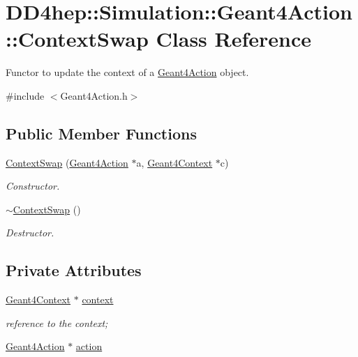 \hypertarget{class_d_d4hep_1_1_simulation_1_1_geant4_action_1_1_context_swap}{
\section{DD4hep::Simulation::Geant4Action::ContextSwap Class Reference}
\label{class_d_d4hep_1_1_simulation_1_1_geant4_action_1_1_context_swap}
}


Functor to update the context of a \hyperlink{class_d_d4hep_1_1_simulation_1_1_geant4_action}{Geant4Action} object.  


{\ttfamily \#include $<$Geant4Action.h$>$}\subsection*{Public Member Functions}
\begin{DoxyCompactItemize}
\item 
\hyperlink{class_d_d4hep_1_1_simulation_1_1_geant4_action_1_1_context_swap_a671e15a7c4487dea998af2e002aa78d6}{ContextSwap} (\hyperlink{class_d_d4hep_1_1_simulation_1_1_geant4_action}{Geant4Action} $\ast$a, \hyperlink{class_d_d4hep_1_1_simulation_1_1_geant4_context}{Geant4Context} $\ast$c)
\begin{DoxyCompactList}\small\item\em Constructor. \item\end{DoxyCompactList}\item 
\hyperlink{class_d_d4hep_1_1_simulation_1_1_geant4_action_1_1_context_swap_a5f404e4ada6eb6aead85fa78d3f7b233}{$\sim$ContextSwap} ()
\begin{DoxyCompactList}\small\item\em Destructor. \item\end{DoxyCompactList}\end{DoxyCompactItemize}
\subsection*{Private Attributes}
\begin{DoxyCompactItemize}
\item 
\hyperlink{class_d_d4hep_1_1_simulation_1_1_geant4_context}{Geant4Context} $\ast$ \hyperlink{class_d_d4hep_1_1_simulation_1_1_geant4_action_1_1_context_swap_aacd9a019417cad92349a8cd6597941c4}{context}
\begin{DoxyCompactList}\small\item\em reference to the context; \item\end{DoxyCompactList}\item 
\hyperlink{class_d_d4hep_1_1_simulation_1_1_geant4_action}{Geant4Action} $\ast$ \hyperlink{class_d_d4hep_1_1_simulation_1_1_geant4_action_1_1_context_swap_adbbfc954d09ad3d8b807bae2612ef23e}{action}
\end{DoxyCompactItemize}


